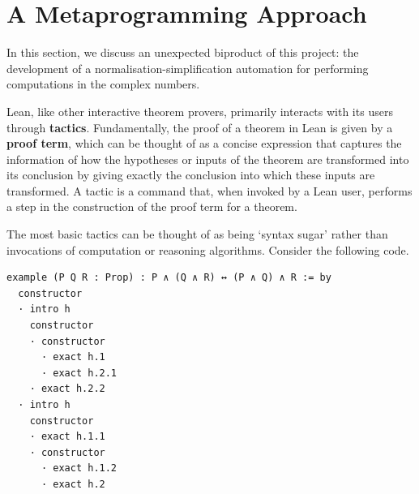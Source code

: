 \section{A Metaprogramming Approach}

In this section, we discuss an unexpected biproduct of this project: the development of a normalisation-simplification automation for performing computations in the complex numbers.

Lean, like other interactive theorem provers, primarily interacts with its users through \textbf{tactics}. Fundamentally, the proof of a theorem in Lean is given by a \textbf{proof term}, which can be thought of as a concise expression that captures the information of how the hypotheses or inputs of the theorem are transformed into its conclusion by giving exactly the conclusion into which these inputs are transformed. A tactic is a command that, when invoked by a Lean user, performs a step in the construction of the proof term for a theorem.

The most basic tactics can be thought of as being `syntax sugar' rather than invocations of computation or reasoning algorithms. Consider the following code.
\begin{lstlisting}[caption=A tactic-mode proof of the associativity of $\land$, label=Ch5:Listing:And_assoc_tactic]
example (P Q R : Prop) : P ∧ (Q ∧ R) ↔ (P ∧ Q) ∧ R := by
  constructor
  · intro h
    constructor
    · constructor
      · exact h.1
      · exact h.2.1
    · exact h.2.2
  · intro h
    constructor
    · exact h.1.1
    · constructor
      · exact h.1.2
      · exact h.2
\end{lstlisting}


